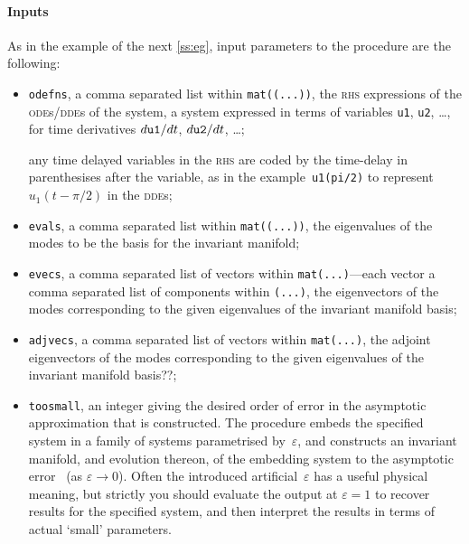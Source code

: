 \documentclass[11pt,a5paper]{article}
\def\eps{\varepsilon}
\begin{document}
\paragraph{Inputs}
As in the example of the next \cref{ss:eg}, input parameters 
to the procedure are the following: \begin{itemize}

\item \verb|odefns|, a comma separated list within
\verb|mat((...))|, the \textsc{rhs} expressions of the
\textsc{ode}s/\textsc{dde}s of the system, a system expressed in terms of variables \verb|u1|, \verb|u2|, \ldots, for time derivatives \(\de t{\tt u1}\), \(\de t{\tt u2}\), \ldots;

any time delayed variables in the \textsc{rhs} are coded by the time-delay in parenthesises after the variable, as in the example~\verb|u1(pi/2)| to represent~\(u_1(t-\pi/2)\) in the \textsc{dde}s;

\item \verb|evals|, a comma separated list within
\verb|mat((...))|, the eigenvalues of the modes to be the
basis for the invariant manifold;

\item \verb|evecs|, a comma separated list of vectors within
\verb|mat(...)|---each vector a comma separated list of
components within \verb|(...)|, the eigenvectors of the
modes corresponding to the given eigenvalues of the
invariant manifold basis;

\item \verb|adjvecs|, a comma separated list of vectors
within \verb|mat(...)|, the adjoint eigenvectors
of the modes corresponding to the given eigenvalues of the
invariant manifold basis??;

\item \verb|toosmall|, an integer giving the desired order
of error in the asymptotic approximation that is
constructed.  The procedure embeds the specified system in a family of systems parametrised by~\(\eps\), and constructs an invariant manifold, and evolution thereon, of the embedding system to the asymptotic error~\Ord{\eps^{\tt toosmall}} (as \(\eps\to0\)).
Often the introduced artificial~\(\eps\) has a useful physical meaning, but strictly you should  evaluate the output at \(\eps=1\) to recover results for the specified system, and then interpret the results in terms of actual `small' parameters.

\end{itemize}
\end{document}
